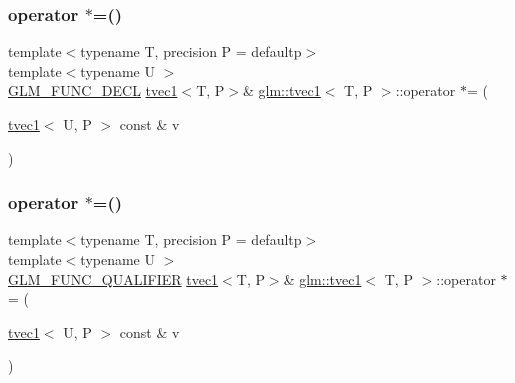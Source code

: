 \mbox{\label{structglm_1_1tvec1_aead4fc78cff7b51e4d213e71fd5ce6a3}} 
\subsubsection{\texorpdfstring{operator $\ast$=()}{operator *=()}\hspace{0.1cm}{\footnotesize\ttfamily [3/4]}}
{\footnotesize\ttfamily template$<$typename T, precision P = defaultp$>$ \\
template$<$typename U $>$ \\
\mbox{\hyperlink{setup_8hpp_ab2d052de21a70539923e9bcbf6e83a51}{G\+L\+M\+\_\+\+F\+U\+N\+C\+\_\+\+D\+E\+CL}} \mbox{\hyperlink{structglm_1_1tvec1}{tvec1}}$<$T, P$>$\& \mbox{\hyperlink{structglm_1_1tvec1}{glm\+::tvec1}}$<$ T, P $>$\+::operator $\ast$= (\begin{DoxyParamCaption}\item[{\mbox{\hyperlink{structglm_1_1tvec1}{tvec1}}$<$ U, P $>$ const \&}]{v }\end{DoxyParamCaption})}

\mbox{\label{structglm_1_1tvec1_a44a1f4ca2a947b65ba347bdea6d314ca}} 
\subsubsection{\texorpdfstring{operator $\ast$=()}{operator *=()}\hspace{0.1cm}{\footnotesize\ttfamily [4/4]}}
{\footnotesize\ttfamily template$<$typename T, precision P = defaultp$>$ \\
template$<$typename U $>$ \\
\mbox{\hyperlink{setup_8hpp_a33fdea6f91c5f834105f7415e2a64407}{G\+L\+M\+\_\+\+F\+U\+N\+C\+\_\+\+Q\+U\+A\+L\+I\+F\+I\+ER}} \mbox{\hyperlink{structglm_1_1tvec1}{tvec1}}$<$T, P$>$\& \mbox{\hyperlink{structglm_1_1tvec1}{glm\+::tvec1}}$<$ T, P $>$\+::operator $\ast$= (\begin{DoxyParamCaption}\item[{\mbox{\hyperlink{structglm_1_1tvec1}{tvec1}}$<$ U, P $>$ const \&}]{v }\end{DoxyParamCaption})}



